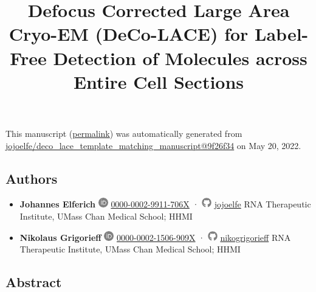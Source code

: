 \documentclass[
]{article}
\title{Defocus Corrected Large Area Cryo-EM (DeCo-LACE) for Label-Free Detection of Molecules across Entire Cell Sections}
\author{}
\date{}
\begin{document}
\maketitle

This manuscript
(\href{https://jojoelfe.github.io/deco_lace_template_matching_manuscript/v/9f26f343eb6707bf20436bc0f58fa1c34dc74c00/}{permalink})
was automatically generated
from \href{https://github.com/jojoelfe/deco_lace_template_matching_manuscript/tree/9f26f343eb6707bf20436bc0f58fa1c34dc74c00}{jojoelfe/deco\_lace\_template\_matching\_manuscript@9f26f34}
on May 20, 2022.

\hypertarget{authors}{%
\subsection{Authors}\label{authors}}

\begin{itemize}
\item
  \textbf{Johannes Elferich}
  \includegraphics[width=0.16667in,height=0.16667in]{images/orcid.pdf}
  \href{https://orcid.org/0000-0002-9911-706X}{0000-0002-9911-706X}
  · \includegraphics[width=0.16667in,height=0.16667in]{images/github.pdf}
  \href{https://github.com/jojoelfe}{jojoelfe}
  RNA Therapeutic Institute, UMass Chan Medical School; HHMI
\item
  \textbf{Nikolaus Grigorieff}
  \includegraphics[width=0.16667in,height=0.16667in]{images/orcid.pdf}
  \href{https://orcid.org/0000-0002-1506-909X}{0000-0002-1506-909X}
  · \includegraphics[width=0.16667in,height=0.16667in]{images/github.pdf}
  \href{https://github.com/nikogrigorieff}{nikogrigorieff}
  RNA Therapeutic Institute, UMass Chan Medical School; HHMI
\end{itemize}

\hypertarget{abstract}{%
\subsection{Abstract}\label{abstract}}
\end{document}
